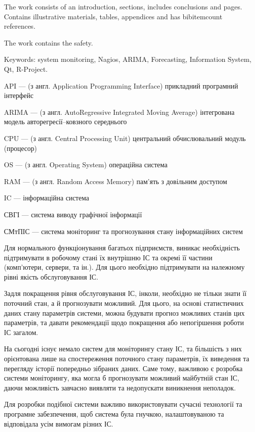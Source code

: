 \documentclass{thesis_utf8}
\begin{document}
The work consists of an introduction,  sections, includes conclusions and  pages.  Contains
 illustrative materials,  tables,  appendices and has \total
{bibitemcount} references.

The work contains the safety.

Keywords: system monitoring, Nagios, ARIMA, Forecasting, Information System, Qt, R-Project.
\clearpage

\tableofcontents

\shortings
API --- (з англ. Application Programming Interface) прикладний програмний інтерфейс

ARIMA --- (з англ. AutoRegressive Integrated Moving Average) інтегрована модель авторегресії--ковзного середнього

CPU --- (з англ. Central Processing Unit) центральний обчислювальний модуль (процесор)

OS --- (з англ. Operating System) операційна система

RAM --- (з англ. Random Access Memory) пам'ять з довільним доступом

IC --- інформаційна система

СВГІ --- система виводу графічної інформації

СМтПІС --- система моніторинг та прогнозування стану інформаційних систем

\intro
Для нормального функціонування багатьох підприємств, виникає необхідність підтримувати в робочому стані їх внутрішню
ІС та окремі її частини (комп'ютери, сервери, та ін.). Для цього необхідно підтримувати на належному рівні якість
обслуговування ІС.

Задля покращення рівня обслуговування ІС, інколи, необхідно не тільки знати її поточний стан, а й прогнозувати
можливий. Для цього, на основі статистичних даних стану параметрів системи, можна будувати прогноз можливих станів цих
параметрів, та давати рекомендації щодо покращення або непогіршення роботи ІС загалом.

На сьогодні існує немало систем для моніторингу стану ІС, та більшість з них орієнтована лише на спостереження
поточного стану параметрів, їх виведення та перегляду історії попередньо зібраних даних. Саме тому, важливою є
розробка системи моніторингу, яка могла б прогнозувати можливий майбутній стан ІС, даючи можливість завчасно виявляти
та недопускати виникнення неполадок.

Для розробки подібної системи важливо використовувати сучасні технології та програмне забезпечення, щоб система була
гнучкою, налаштовуваною та відповідала усім вимогам різних ІС.
\end{document}
